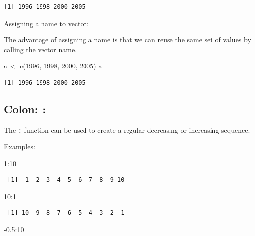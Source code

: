 \documentclass[
  letterpaper,
  DIV=11,
  numbers=noendperiod]{scrreprt}
\newenvironment{Shaded}{\begin{snugshade}}{\end{snugshade}}
\newcommand{\DecValTok}[1]{\textcolor[rgb]{0.68,0.00,0.00}{#1}}
\newcommand{\FloatTok}[1]{\textcolor[rgb]{0.68,0.00,0.00}{#1}}
\newcommand{\FunctionTok}[1]{\textcolor[rgb]{0.28,0.35,0.67}{#1}}
\newcommand{\NormalTok}[1]{\textcolor[rgb]{0.00,0.23,0.31}{#1}}
\newcommand{\OtherTok}[1]{\textcolor[rgb]{0.00,0.23,0.31}{#1}}
\newcommand{\SpecialCharTok}[1]{\textcolor[rgb]{0.37,0.37,0.37}{#1}}
\begin{document}
\begin{verbatim}
[1] 1996 1998 2000 2005
\end{verbatim}

Assigning a name to vector:

The advantage of assigning a name is that we can reuse the same set of
values by calling the vector name.

\begin{Shaded}
\begin{Highlighting}[]
\NormalTok{a }\OtherTok{\textless{}{-}} \FunctionTok{c}\NormalTok{(}\DecValTok{1996}\NormalTok{, }\DecValTok{1998}\NormalTok{, }\DecValTok{2000}\NormalTok{, }\DecValTok{2005}\NormalTok{)}
\NormalTok{a}
\end{Highlighting}
\end{Shaded}

\begin{verbatim}
[1] 1996 1998 2000 2005
\end{verbatim}

\hypertarget{colon}{%
\subsection{\texorpdfstring{Colon: \texttt{:}}{Colon: :}}\label{colon}}

The \texttt{:} function can be used to create a regular decreasing or
increasing sequence.

Examples:

\begin{Shaded}
\begin{Highlighting}[]
\DecValTok{1}\SpecialCharTok{:}\DecValTok{10}
\end{Highlighting}
\end{Shaded}

\begin{verbatim}
 [1]  1  2  3  4  5  6  7  8  9 10
\end{verbatim}

\begin{Shaded}
\begin{Highlighting}[]
\DecValTok{10}\SpecialCharTok{:}\DecValTok{1}
\end{Highlighting}
\end{Shaded}

\begin{verbatim}
 [1] 10  9  8  7  6  5  4  3  2  1
\end{verbatim}

\begin{Shaded}
\begin{Highlighting}[]
\SpecialCharTok{{-}}\FloatTok{0.5}\SpecialCharTok{:}\DecValTok{10}
\end{Highlighting}
\end{Shaded}
\end{document}
